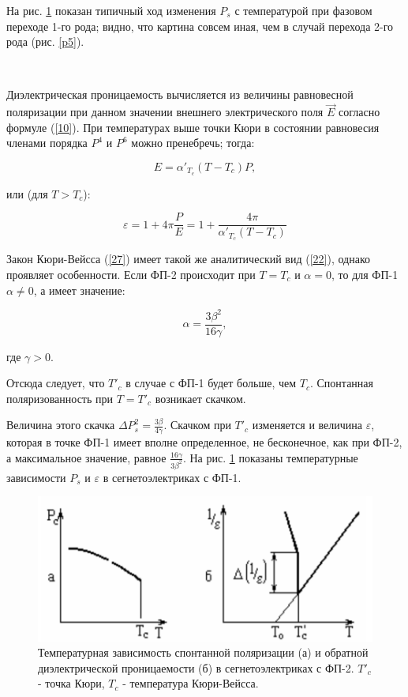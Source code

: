 \documentclass[a4paper]{article}
\begin{document}
На рис. \ref{p7} показан типичный ход изменения $P_s$ с температурой при фазовом переходе 1-го рода; видно, что картина совсем иная, чем в случай перехода 2-го рода (рис. \ref{p5}). 

\

Диэлектрическая проницаемость вычисляется из величины равновесной поляризации при данном значении внешнего электрического поля $\vec{E}$ согласно формуле (\ref{10}). При температурах выше точки Кюри в состоянии равновесия членами порядка $P^4$ и $P^6$ можно пренебречь; тогда:

\begin{equation}
E = \alpha'_{T_c} (T - T_c)P,
\label{26}
\end{equation}

или (для $T > T_c$):

\begin{equation}
\varepsilon = 1+ 4\pi \frac{P}{E} = 1 + \frac{4\pi}{\alpha'_{T_c} (T - T_c)}
\label{27}
\end{equation}

Закон Кюри-Вейсса (\ref{27}) имеет такой же аналитический вид (\ref{22}), однако проявляет особенности. Если ФП-2 происходит при $T = T_c$ и $\alpha = 0$, то для ФП-1  $\alpha \neq 0$, а имеет значение:

\begin{equation}
\alpha = \frac{3 \beta^2}{16 \gamma},
\label{27}
\end{equation}

где $\gamma > 0$. 

Отсюда следует, что $T'_c$ в случае с ФП-1 будет больше, чем $T_c$. Спонтанная поляризованность при $T = T'_c$ возникает скачком. 

Величина этого скачка $\Delta P^2_s = \frac{3 \beta}{4 \gamma}$. Скачком при $T'_c$ изменяется и величина $\varepsilon$, которая в точке ФП-1 имеет вполне определенное, не бесконечное, как при ФП-2, а максимальное значение, равное $\frac{16\gamma}{3\beta^2}$. На рис. \ref{p7} показаны температурные зависимости $P_s$ и $\varepsilon$ в сегнетоэлектриках с ФП-1. 

\begin{figure}[H]
\begin{center}
\includegraphics[scale = 0.7]{p8.png}
\caption{Температурная зависимость спонтанной поляризации (а) и обратной диэлектрической проницаемости (б) в сегнетоэлектриках с ФП-2. $T'_c$ - точка Кюри, $T_c$ - температура Кюри-Вейсса. }
\label{p7}
\end{center}
\end{figure}
\end{document}
